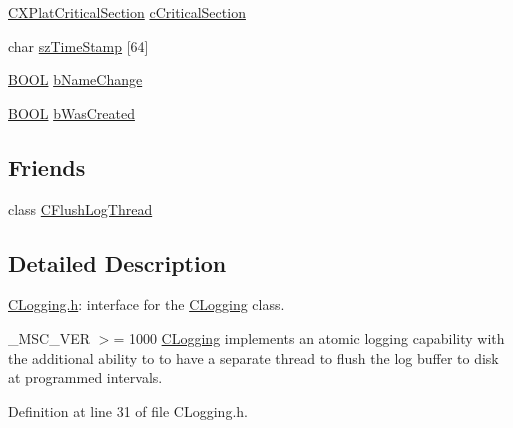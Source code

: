 \begin{DoxyCompactItemize}
\item 
\hyperlink{class_c_x_plat_critical_section}{\-C\-X\-Plat\-Critical\-Section} \hyperlink{class_c_logging_aa134867b95328a1b127d1d65ebf6e3cc}{c\-Critical\-Section}
\item 
char \hyperlink{class_c_logging_a7fa407b1c3154d7e6da724e20f54eba7}{sz\-Time\-Stamp} \mbox{[}64\mbox{]}
\item 
\hyperlink{_cpclient_8h_a3be13892ae7076009afcf121347dd319}{\-B\-O\-O\-L} \hyperlink{class_c_logging_a25817aa5c45e20b1a719848c59af7847}{b\-Name\-Change}
\item 
\hyperlink{_cpclient_8h_a3be13892ae7076009afcf121347dd319}{\-B\-O\-O\-L} \hyperlink{class_c_logging_a1974158ff1af590d9bb2d682590ec980}{b\-Was\-Created}
\end{DoxyCompactItemize}
\subsection*{\-Friends}
\begin{DoxyCompactItemize}
\item 
class \hyperlink{class_c_logging_a8195bd28b7fea3076fb1fcbc41f0de8c}{\-C\-Flush\-Log\-Thread}
\end{DoxyCompactItemize}


\subsection{\-Detailed \-Description}
\hyperlink{_c_logging_8h}{\-C\-Logging.\-h}\-: interface for the \hyperlink{class_c_logging}{\-C\-Logging} class. 

\-\_\-\-M\-S\-C\-\_\-\-V\-E\-R $>$= 1000 \hyperlink{class_c_logging}{\-C\-Logging} implements an atomic logging capability with the additional ability to to have a separate thread to flush the log buffer to disk at programmed intervals. 

\-Definition at line 31 of file \-C\-Logging.\-h.




